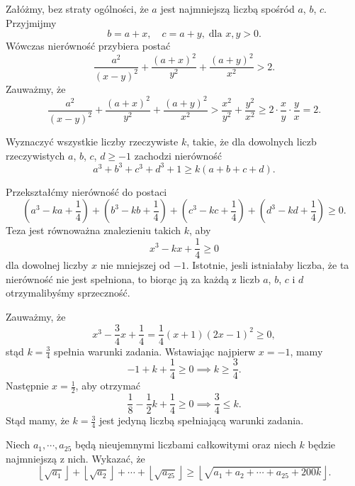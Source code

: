 \noindent
Załóżmy, bez straty ogólności, że $a$ jest najmniejszą liczbą spośród $a$, $b$, $c$. Przyjmijmy
\[
	b = a + x, \quad c = a + y, \; \text{dla } x, y > 0.
\]
Wówczas nierówność przybiera postać
\[
	\frac{a^2}{(x - y)^2} + \frac{(a + x)^2}{y^2} + \frac{(a + y)^2}{x^2} > 2.
\]
Zauważmy, że
\[
	\frac{a^2}{(x - y)^2} + \frac{(a + x)^2}{y^2} + \frac{(a + y)^2}{x^2} > \frac{x^2}{y^2} + \frac{y^2}{x^2} \geqslant 2 \cdot \frac{x}{y} \cdot \frac{y}{x} = 2.
\]

\begin{problem}{5}
Wyznaczyć wszystkie liczby rzeczywiste $k$, takie, że dla dowolnych liczb rzeczywistych $a$, $b$, $c$, $d \geqslant -1$ zachodzi nierówność
\[
	a^3 + b^3 + c^3 + d^3 + 1 \geqslant k(a + b + c + d).
\]
\end{problem}

\noindent
Przekształćmy nierówność do postaci
\[
	\left(a^3 - ka + \frac{1}{4}\right) + \left(b^3 - kb + \frac{1}{4}\right) + \left(c^3 - kc + \frac{1}{4}\right) + \left(d^3 - kd + \frac{1}{4}\right) \geqslant 0.
\]
Teza jest równoważna znalezieniu takich $k$, aby
\[
	x^3 - kx + \frac{1}{4} \geqslant 0
\]
dla dowolnej liczby $x$ nie mniejszej od $-1$. Istotnie, jesli istniałaby liczba, że ta nierówność nie jest spełniona, to biorąc ją za każdą z liczb $a$, $b$, $c$ i $d$ otrzymalibyśmy sprzeczność.

\noindent
Zauważmy, że
\[
	x^3 - \frac{3}{4}x + \frac{1}{4} = \frac{1}{4}(x + 1)(2x - 1)^2 \geqslant 0,
\]
stąd $k = \frac{3}{4}$ spełnia warunki zadania. Wstawiając najpierw $x = -1$, mamy
\[
	-1 + k + \frac{1}{4} \geqslant 0 \implies k \geqslant \frac{3}{4}.
\]
Następnie $x = \frac12$, aby otrzymać
\[
	\frac{1}{8} - \frac12k + \frac14 \geqslant 0 \implies \frac34 \leqslant k.
\]
Stąd mamy, że $k = \frac{3}{4}$ jest jedyną liczbą spełniającą warunki zadania.
\vspace{5px}

\begin{problem}{6}
Niech  $ a_1,\cdots , a_{25}$ będą nieujemnymi liczbami całkowitymi oraz niech $ k$ będzie najmniejszą z nich. Wykazać, że
\[
	\left\lfloor\sqrt{a_1}\right\rfloor + \left\lfloor\sqrt{a_2}\right\rfloor + \cdots + \left\lfloor\sqrt{a_{25}}\right\rfloor \geqslant \left\lfloor\sqrt{a_1 + a_2 + \cdots + a_{25} + 200k}\right\rfloor.
\]
\end{problem}

